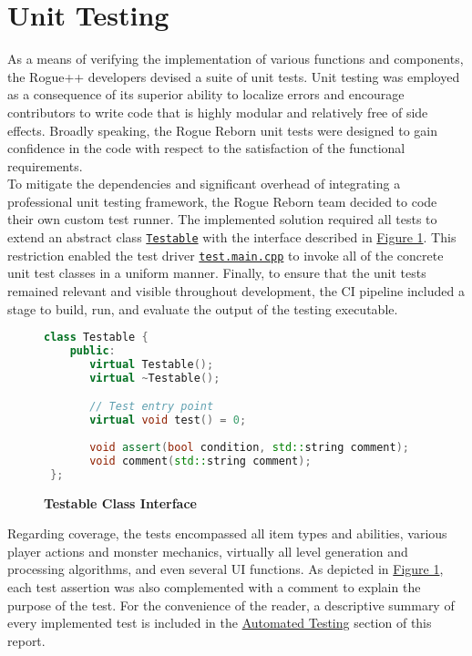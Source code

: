\documentclass[12pt, titlepage]{article}
\newcommand{\newsection}[1]{
  \newpage
  \section{#1}
}
\begin{document}
\newsection{Unit Testing} \label{Section_UT}
	As a means of verifying the implementation of various functions and components, the Rogue++ developers devised a suite of unit tests.  Unit testing was employed as a consequence of its superior ability to localize errors and encourage contributors to write code that is highly modular and relatively free of side effects.  Broadly speaking, the Rogue Reborn unit tests were designed to gain confidence in the code with respect to the satisfaction of the functional requirements.\\

	To mitigate the dependencies and significant overhead of integrating a professional unit testing framework, the Rogue Reborn team decided to code their own custom test runner.  The implemented solution required all tests to extend an abstract class \href{run:../../src/test.testable.h}{\lstinline$Testable$} with the interface described in \hyperref[Figure_Testable]{Figure 1}.  This restriction enabled the test driver \href{run:../../src/test.main.cpp}{\lstinline$test.main.cpp$} to invoke all of the concrete unit test classes in a uniform manner.  Finally, to ensure that the unit tests remained relevant and visible throughout development, the CI pipeline included a stage to build, run, and evaluate the output of the testing executable.

	\begin{figure}[H] \label{Figure_Testable}
		\caption{\bf Testable Class Interface}
		\centering
		\begin{lstlisting}[language=C++]
 class Testable {
    public:
       virtual Testable();
       virtual ~Testable();

       // Test entry point
       virtual void test() = 0;
            
       void assert(bool condition, std::string comment);
       void comment(std::string comment);
 };
		\end{lstlisting}
	\end{figure} 

	Regarding coverage, the tests encompassed all item types and abilities, various player actions and monster mechanics, virtually all level generation and processing algorithms, and even several UI functions.  As depicted in \hyperref[Figure_Testable]{Figure 1}, each test assertion was also complemented with a comment to explain the purpose of the test.  For the convenience of the reader, a descriptive summary of every implemented test is included in the \hyperref[Section_Automated]{Automated Testing} section of this report.\\
\end{document}
